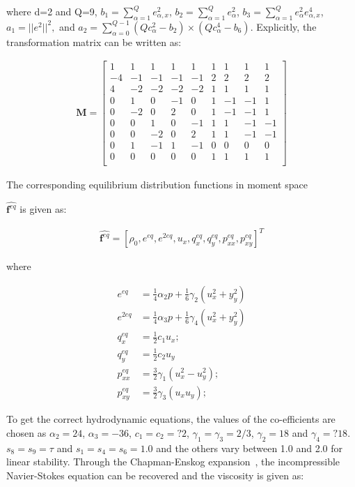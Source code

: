 \noindent where d=2 and Q=9, $b_1=\sum_{\alpha=1}^{Q}e_{\alpha,x}^2$, 
$b_2=\sum_{\alpha=1}^{Q}e_{\alpha}^2$, 
$b_3=\sum_{\alpha=1}^{Q}e_{\alpha}^2e_{\alpha,x}^4$, $a_1=||e^2||^2,$ and $a_2=\sum_{\alpha=0}^{Q-1}(Qc_{\alpha}^2-b_2)\times(Qc_{\alpha}^4-b_6)$. Explicitly, the transformation matrix can be written as:

\begin{align}
\mathbf{M}= \begin{bmatrix}
 1 &  1 &  1 &  1 &  1 &  1 &  1 &  1 &  1 \\
-4 & -1 & -1 & -1 & -1 &  2 &  2 &  2 &  2 \\ 
 4 & -2 & -2 & -2 & -2 &  1 &  1 &  1 &  1 \\
 0 &  1 &  0 & -1 &  0 &  1 & -1 & -1 &  1 \\
 0 & -2 &  0 &  2 &  0 &  1 & -1 & -1 &  1 \\
 0 &  0 &  1 &  0 & -1 &  1 &  1 & -1 & -1 \\
 0 &  0 & -2 &  0 &  2 &  1 &  1 & -1 & -1 \\
 0 &  1 & -1 &  1 & -1 &  0 &  0 &  0 &  0 \\
 0 &  0 &  0 &  0 &  0 &  1 &  1 &  1 &  1 \\
\end{bmatrix}
\end{align}

The corresponding equilibrium distribution functions in moment space 

$\widehat{\mathbf{f}^{eq}}$ is given as:

\begin{align}
\widehat{\mathbf{f}^{eq}}=\left[\rho_0,e^{eq},e^{2eq},u_x,q_x^{eq},q_y^{eq},p_{xx}^{eq},p_{xy}^{eq}\right]^T
\end{align}

\noindent where

\begin{align}
e^{eq} & = \frac{1}{4}\alpha_2p+\frac{1}{6}\gamma_2(u_x^2+y_y^2)\\
e^{2eq} & = \frac{1}{4}\alpha_3p+\frac{1}{6}\gamma_4(u_x^2+y_y^2)\\
q_x^{eq} & = \frac{1}{2}c_1u_x;\\
q_y^{eq} & = \frac{1}{2}c_2u_y \\
p_{xx}^{eq} & = \frac{3}{2}\gamma_1(u_x^2 - u_y^2);\\
p_{xy}^{eq} & = \frac{3}{2}\gamma_3(u_xu_y);
\end{align}

To get the correct hydrodynamic equations, the values of the co-efficients are 
chosen as $\alpha_2=24$,  $\alpha_3=-36$, $c_1=c_2=?2$, 
$\gamma_1=\gamma_3=2/3$, $\gamma_2=18$ and $\gamma_4=?18$. $s_8 = s_9 = \tau$ 
and $s_1=s_4=s_6=1.0$ and the others vary between 1.0 and 2.0 for linear 
stability. Through the Chapman-Enskog expansion~\citep{Du2006}, the 
incompressible Navier-Stokes equation can be recovered and the viscosity is 
given as:

